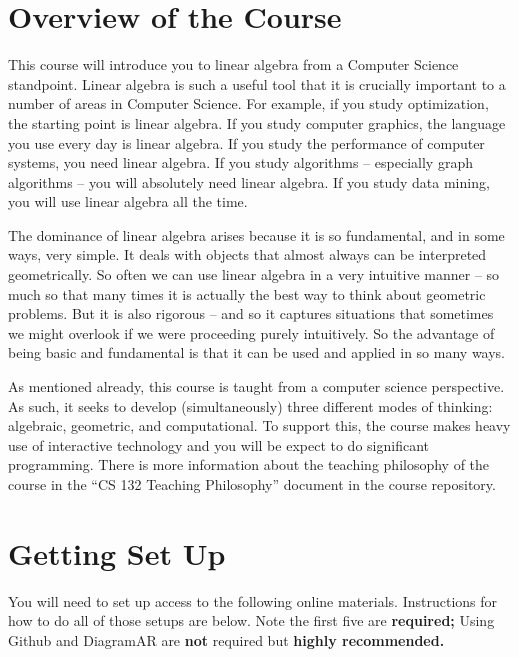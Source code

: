 \documentclass[11pt]{article}
\begin{document}
\section*{Overview of the Course}

This course will introduce you to linear algebra from a Computer Science
standpoint.  Linear algebra is such a useful tool that it is crucially
important to a number of areas in Computer Science. For example, if you study
optimization, the starting point is linear algebra. If you study
computer graphics, the language you use every day is linear algebra. If
you study the performance of computer systems, you need linear
algebra. If you study algorithms -- especially graph algorithms -- you
will absolutely need linear algebra. If you study data mining, you will
use linear algebra all the time. 

The dominance of linear algebra arises because it is so fundamental, and
in some ways, very simple. It deals with objects that almost always can
be interpreted geometrically. So often we can use linear algebra in a
very intuitive manner -- so much so that many times it is actually the
best way to think about geometric problems. But it is also rigorous --
and so it
captures situations that sometimes we might overlook if we were
proceeding purely intuitively.  So the
advantage of being basic and fundamental is that it can be used and
applied in so many ways. 

As mentioned already, this course is taught from a computer science
perspective.  As such, it 
seeks to develop (simultaneously) three different modes of thinking:
algebraic, geometric, and computational.    To support this, the course
makes heavy use of interactive technology and you will be expect to do
significant programming.    There is more information about the teaching
philosophy of the course in the ``CS 132 Teaching Philosophy'' document
in the course repository.

\section*{Getting Set Up}

You will need to set up access to the following online materials.
Instructions for how to do all of those setups are below.   Note the
first five are \textbf{required;}  Using Github and DiagramAR are
\textbf{not}  required but \textbf{highly recommended.}
\end{document}
